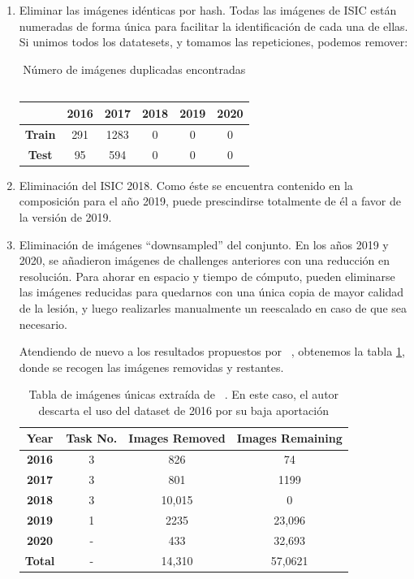\begin{enumerate}
	
	
	\item Eliminar las imágenes idénticas por hash. Todas las imágenes de ISIC están numeradas de forma única para facilitar la identificación de cada una de ellas. Si unimos todos los datatesets, y tomamos las repeticiones, podemos remover:
	
	\begin{table}[H]
		\centering
		\begin{tabular}{|c|c|c|c|c|c|}
			\hline
			\textbf{} & \textbf{2016} & \textbf{2017} & \textbf{2018} & \textbf{2019} & \textbf{2020} \\ \hline
			\textbf{Train} & 291 & 1283 & 0 & 0 & 0 \\ \hline
			\textbf{Test} & 95 & 594 & 0 & 0 & 0 \\ \hline
		\end{tabular}
		\caption{Número de imágenes duplicadas encontradas ~\cite{CASSIDY2022102305}}
	\end{table}
	
	
	\item 	Eliminación del ISIC 2018. Como éste se encuentra contenido en la composición para el año 2019, puede prescindirse totalmente de él a favor de la versión de 2019.
	\item 	Eliminación de imágenes “downsampled” del conjunto. En los años 2019 y 2020, se añadieron imágenes de challenges anteriores con una reducción en resolución. Para ahorar en espacio y tiempo de cómputo, pueden eliminarse las imágenes reducidas para quedarnos con una única copia de mayor calidad de la lesión, y luego realizarles manualmente un reescalado en caso de que sea necesario.
	
	Atendiendo de nuevo a los resultados propuestos por  ~\cite{CASSIDY2022102305}, obtenemos la tabla \ref{tab:isicresum}, donde se recogen las imágenes removidas y restantes.
	
	\begin{table}[H]
		\centering
		\begin{tabular}{|c|c|c|c|}
			\hline
			\textbf{Year} & \textbf{Task No.} & \textbf{Images Removed} & \textbf{Images Remaining} \\ \hline
			\textbf{2016} & 3 & 826 & 74 \\ \hline
			\textbf{2017} & 3 & 801 & 1199 \\ \hline
			\textbf{2018} & 3 & 10,015 & 0 \\ \hline
			\textbf{2019} & 1 & 2235 & 23,096 \\ \hline
			\textbf{2020} & - & 433 & 32,693 \\ \hline
			\textbf{Total} & - & 14,310 & 57,0621 \\ \hline
		\end{tabular}
		\caption{Tabla de imágenes únicas extraída de ~\cite{CASSIDY2022102305}. En este caso, el autor descarta el uso del dataset de 2016 por su baja aportación}
		\label{tab:isicresum}
	\end{table}
	
\end{enumerate}

